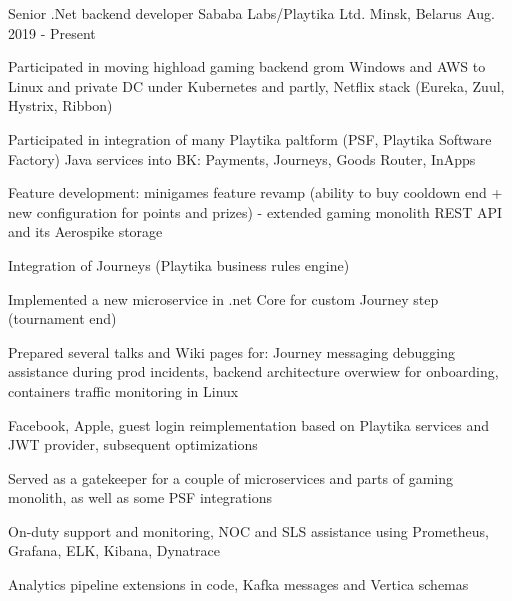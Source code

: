 

\begin{cventries}

  \cventry
    {Senior .Net backend developer} %
    {Sababa Labs/Playtika Ltd.} %
    {Minsk, Belarus} %
    {Aug. 2019 - Present} %
    {
      \begin{cvitems} %
        \item {Participated in moving highload gaming backend grom Windows and AWS to Linux and private DC under Kubernetes and partly, Netflix stack (Eureka, Zuul, Hystrix, Ribbon)}
        \item {Participated in integration of many Playtika paltform (PSF, Playtika Software Factory) Java services into BK: Payments, Journeys, Goods Router, InApps}
        \item {Feature development: minigames feature revamp (ability to buy cooldown end + new configuration for points and prizes) - extended gaming monolith REST API and its Aerospike storage}
        \item {Integration of Journeys (Playtika business rules engine)}
        \item {Implemented a new microservice in .net Core for custom Journey step (tournament end)}
        \item {Prepared several talks and Wiki pages for: Journey messaging debugging assistance during prod incidents, backend architecture overwiew for onboarding, containers traffic monitoring in Linux}
        \item {Facebook, Apple, guest login reimplementation based on Playtika services and JWT provider, subsequent optimizations}
        \item {Served as a gatekeeper for a couple of microservices and parts of gaming monolith, as well as some PSF integrations}
        \item {On-duty support and monitoring, NOC and SLS assistance using Prometheus, Grafana, ELK, Kibana, Dynatrace}
        \item {Analytics pipeline extensions in code, Kafka messages and Vertica schemas}
      \end{cvitems}
    }


\end{cventries}
